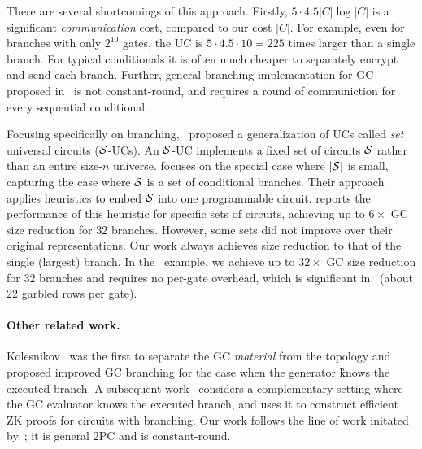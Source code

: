 There are several shortcomings of this approach.  Firstly,  $5\cdot 4.5 |C| \log |C|$ %
is a significant {\em communication} cost, compared to our cost $|C|$.  For example, even for branches with only $2^{10}$ gates, the UC is $5 \cdot 4.5 \cdot 10 = 225$ times larger than a single branch. 
For typical conditionals it is often much cheaper to separately encrypt and send each branch. 
Further, general branching implementation for GC proposed in~\cite{AC:KenKolWil17} is not constant-round, and requires a round of communiction for every sequential conditional.


Focusing specifically on branching,~\cite{AC:KenKolWil17} proposed a generalization of UCs called \emph{set} universal circuits ($\cal S$-UCs).
An $\cal S$-UC implements a fixed set of circuits $\cal S$ rather than an entire size-$n$ universe.
\cite{AC:KenKolWil17} focuses on the special case where $|\cal S|$ is small, capturing the case where $\cal S$ is a set of conditional branches.
Their approach applies heuristics to embed $\cal S$ into one programmable circuit.
\cite{AC:KenKolWil17} reports the performance of this heuristic for specific sets of circuits, achieving up to $6\times$ GC size reduction for $32$ branches.
However, some sets did not improve over their original representations.  Our work always achieves size reduction to that of the single (largest) branch. In the~\cite{AC:KenKolWil17} example, we achieve up to $32\times$ GC size reduction for $32$ branches and requires no per-gate overhead, which is significant  in~\cite{AC:KenKolWil17} (about $22$ garbled rows per gate).  


\paragraph{Other related work.}


Kolesnikov~\cite{AC:Kolesnikov18} was the first to separate the GC {\em material} from the topology and proposed improved GC branching for the case when the generator \G knows the executed branch.  A subsequent work~\cite{EC:HeaKol20} considers a complementary setting where the GC evaluator \E knows the executed branch, and uses it to construct efficient ZK proofs for circuits with branching.
Our work follows the line of work initated by~\cite{AC:Kolesnikov18,EC:HeaKol20}; it is general 2PC and is constant-round.

